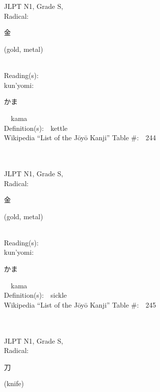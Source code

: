 \begin{multicols}{2}
\ \ \\
{\fontsize{34pt}{40pt}  }\ \ \\
{JLPT N1, Grade S, \\Radical:\ \ {\begin{CJK}{UTF8}{min} 金 \end{CJK}} (gold, metal) } \\
Reading(s):\ \ \\
{\hspace*{1em}}kun'yomi:\ \ \\
{\hspace*{2em}}{\begin{CJK}{UTF8}{min} かま \end{CJK}}\ \ kama\ \ \\
Definition(s):\ \ kettle \\
Wikipedia ``List of the J\=oy\=o Kanji'' Table \#:\ \ 244 \\
\ \ \\
{\fontsize{34pt}{40pt}  }\ \ \\
{JLPT N1, Grade S, \\Radical:\ \ {\begin{CJK}{UTF8}{min} 金 \end{CJK}} (gold, metal) } \\
Reading(s):\ \ \\
{\hspace*{1em}}kun'yomi:\ \ \\
{\hspace*{2em}}{\begin{CJK}{UTF8}{min} かま \end{CJK}}\ \ kama\ \ \\
Definition(s):\ \ sickle \\
Wikipedia ``List of the J\=oy\=o Kanji'' Table \#:\ \ 245 \\
\ \ \\
{\fontsize{34pt}{40pt}  }\ \ \\
{JLPT N1, Grade S, \\Radical:\ \ {\begin{CJK}{UTF8}{min} 刀 \end{CJK}} (knife) } \\

\end{multicols}
